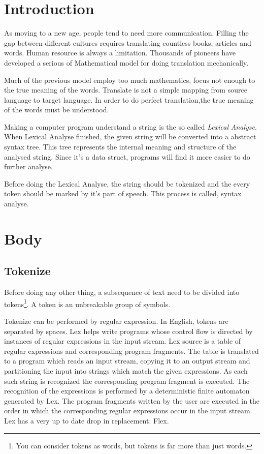 \vspace*{1ex}

\section{Introduction}

\noindent As moving to a new age, people tend to need more communication. Filling the gap between different cultures requires translating countless books, articles and words. Human resource is always a limitation. Thousands of 
pioneers have developed a serious of Mathematical model for doing translation mechanically. 

Much of the previous model employ too much mathematics,
	focus not enough to the true meaning of the words.
Translate is not a simple mapping from source language to target language.
In order to do perfect translation,the true meaning of the words must be understood. 

Making a computer program understand a string is the so called
	 \hbox{\emph{Lexical}} 	\hbox{\emph{Analyse}}. 
When Lexical Analyse finished, the given string will be converted into a abstract syntax tree. 
This tree represents the internal meaning and structure of the analysed string.
Since it's a data struct, programs will find it more easier to do further analyse.
\nocite{Compilers_Principles_Techniques_and_Tools}


Before doing the Lexical Analyse, the string should be tokenized and the every token should be marked by it's part of speech.
This process is called, syntax analyse.

\section{Body}

\subsection{Tokenize}
Before doing any other thing, a subsequence of text need to be divided into tokens\footnote{You can consider tokens as words, but tokens is far more than just words.\footnotemark}.
A token is an unbreakable group of symbols.

Tokenize can be performed by regular expression. In English, tokens are separated by spaces.
Lex\cite{Lex} helps write programs whose control flow is directed by instances of regular expressions in the input stream. Lex source is a table of regular expressions and corresponding program fragments. The table is translated to a program which reads an input stream, copying it to an output stream and partitioning the input into strings which match the given expressions. As each such string is recognized the corresponding program fragment is executed. The recognition of the expressions is performed by a deterministic finite automaton generated by Lex. The program fragments written by the user are executed in the order in which the corresponding regular expressions occur in the input stream. Lex has a very up to date drop in replacement: Flex\cite{flex}. 


